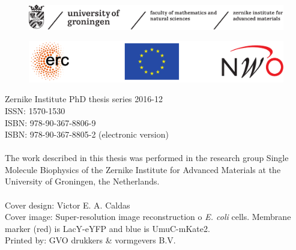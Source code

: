 \begin{titlepage}
%	

	
	
	
	
	\newpage \thispagestyle{empty}
	\vspace*{3.9cm}%
	
	
	\begin{figure}[!h]
		\includegraphics[width=\textwidth]{images/frontmatter/zernike.pdf}
	\end{figure}
	
	\vfill
	\begin{figure}[!h]
		\includegraphics[width=\textwidth]{images/frontmatter/all-logos.pdf}
	\end{figure}
	\noindent
	{\small 
		Zernike Institute PhD thesis series 2016-12 \\
		ISSN:   1570-1530\\
		ISBN:	978-90-367-8806-9 \\
		ISBN:   978-90-367-8805-2 (electronic version) \\
		\\
		The work described in this thesis was performed in the research group Single Molecule Biophysics of the Zernike Institute for Advanced Materials at the University of Groningen, the Netherlands. \\
		\\
		Cover design: Victor E. A. Caldas\\
		Cover image: Super-resolution image reconstruction o \textit{E. coli} cells. Membrane marker (red) is LacY-eYFP and blue is UmuC-mKate2.
		\\
		Printed by: GVO drukkers \& vormgevers B.V. \\
		} 	
	
	
	\clearpage
	
	
	
\end{titlepage}
